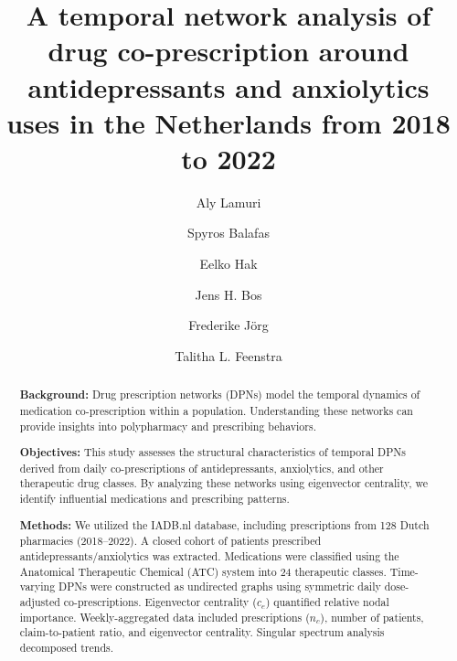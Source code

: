 \documentclass[
  authoryear,
  review]{elsarticle}
\begin{document}
\begin{frontmatter}
\title{A temporal network analysis of drug co-prescription around
antidepressants and anxiolytics uses in the Netherlands from 2018 to
2022}
\author[1,2]{Aly Lamuri%
%
}
\author[1]{Spyros Balafas%
%
}

\author[1]{Eelko Hak%
%
}

\author[1]{Jens H. Bos%
%
}

\author[1,3]{Frederike Jörg%
%
}

\author[1]{Talitha L. Feenstra%
%
}









        
\begin{abstract}
\textbf{Background:} Drug prescription networks (DPNs) model the
temporal dynamics of medication co-prescription within a population.
Understanding these networks can provide insights into polypharmacy and
prescribing behaviors.

\textbf{Objectives:} This study assesses the structural characteristics
of temporal DPNs derived from daily co-prescriptions of antidepressants,
anxiolytics, and other therapeutic drug classes. By analyzing these
networks using eigenvector centrality, we identify influential
medications and prescribing patterns.

\textbf{Methods:} We utilized the IADB.nl database, including
prescriptions from 128 Dutch pharmacies (2018--2022). A closed cohort of
patients prescribed antidepressants/anxiolytics was extracted.
Medications were classified using the Anatomical Therapeutic Chemical
(ATC) system into 24 therapeutic classes. Time-varying DPNs were
constructed as undirected graphs using symmetric daily dose-adjusted
co-prescriptions. Eigenvector centrality (\(c_e\)) quantified relative
nodal importance. Weekly-aggregated data included prescriptions
(\(n_c\)), number of patients, claim-to-patient ratio, and eigenvector
centrality. Singular spectrum analysis decomposed trends.


\end{abstract}
\end{frontmatter}
\end{document}

